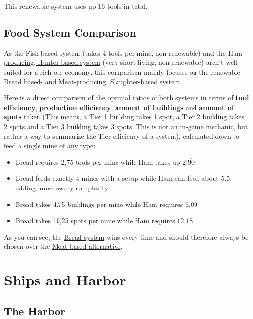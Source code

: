 \documentclass[12pt]{article}
\begin{document}
This renewable system uses up 16 tools in total.

\subsection{Food System Comparison}
\label{sec:foodsystemcomparison}

As the \hyperref[sec:fish]{Fish based system} (takes 4 tools per mine, non-renewable) and the \hyperref[sec:hamhunter]{Ham producing, Hunter-based system} (very short living, non-renewable) aren't well suited for a rich ore economy, this comparison mainly focuses on the renewable \hyperref[sec:bread]{Bread based-} and \hyperref[sec:hamslaughter]{Meat-producing, Slaughter-based system}.

Here is a direct comparison of the optimal ratios of both systems in terms of \textbf{tool efficiency}, \textbf{production efficiency}, \textbf{amount of buildings} and \textbf{amount of spots} taken (This means, a Tier 1 building takes 1 spot, a Tier 2 building takes 2 spots and a Tier 3 building takes 3 spots. This is not an in-game mechanic, but rather a way to summarize the Tier efficiency of a system), calculated down to feed a single mine of any type:

\begin{itemize}
  \item Bread requires 2,75 tools per mine while Ham takes up $2.\overline{90}$
  \item Bread feeds exactly 4 mines with a setup while Ham can feed about 5.5, adding unnecessary complexity
  \item Bread takes 4,75 buildings per mine while Ham requires $5.\overline{09}$
  \item Bread takes 10,25 spots per mine while Ham requires $12.\overline{18}$
\end{itemize}

As you can see, the \hyperref[sec:bread]{Bread system} wins every time and should therefore always be chosen over the \hyperref[sec:hamslaughter]{Meat-based alternative}.

\section{Ships and Harbor}
\label{sec:shipsandharbor}

\subsection{The Harbor}
\label{sec:harbor}
\end{document}
